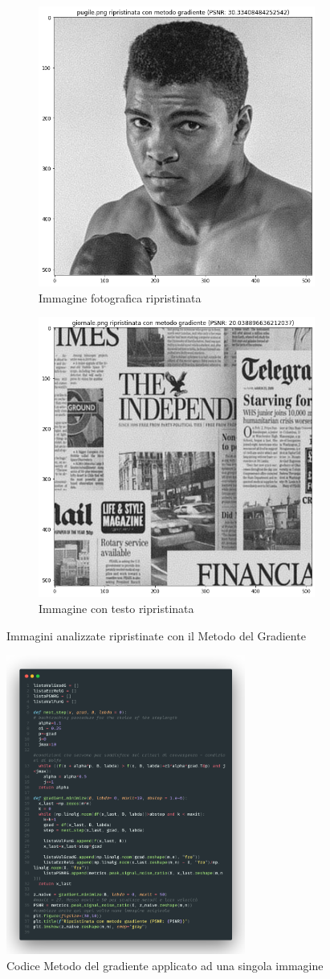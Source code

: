 \begin{figure}[H]
    \begin{subfigure}{0.5\textwidth}
        \centering
    \includegraphics[width=0.6\linewidth]{imgRel/fotogrmg.png}
    \caption{Immagine fotografica ripristinata}
    \label{fig:pugilegradiente}
    \end{subfigure}%
    \begin{subfigure}{0.5\textwidth}\centering
        \includegraphics[width=0.6\linewidth]{imgRel/giornalemg.png}
        \caption{Immagine con testo ripristinata}
    \end{subfigure}
\caption{Immagini analizzate ripristinate con il Metodo del Gradiente}
\end{figure}
\begin{figure}[H]
    \centering
    \includegraphics[width=0.7\textwidth]{imgCode/metGrad.png}
    \caption{Codice Metodo del gradiente applicato ad una singola immagine}
\end{figure}

